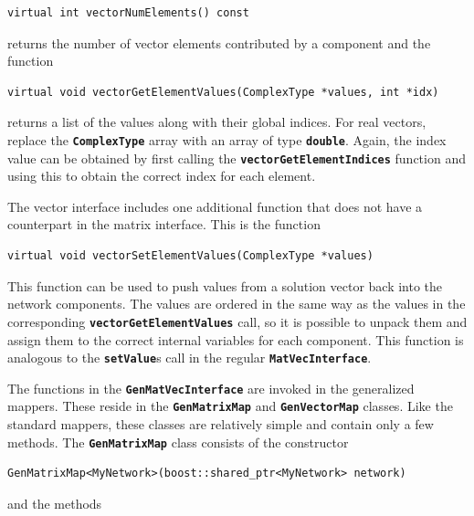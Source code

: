 \documentclass[12pt]{report} %
\begin{document}
{
\color{red}
\begin{Verbatim}[fontseries=b]
virtual int vectorNumElements() const
\end{Verbatim}
}

returns the number of vector elements contributed by a component and the function

{
\color{red}
\begin{Verbatim}[fontseries=b]
virtual void vectorGetElementValues(ComplexType *values, int *idx)
\end{Verbatim}
}

returns a list of the values along with their global indices. For real vectors, replace the \texttt{\textbf{ComplexType}} array with an array of type \texttt{\textbf{double}}. Again, the index value can be obtained by first calling the \texttt{\textbf{vectorGetElementIndices}} function and using this to obtain the correct index for each element.

The vector interface includes one additional function that does not have a counterpart in the matrix interface. This is the function

{
\color{red}
\begin{Verbatim}[fontseries=b]
virtual void vectorSetElementValues(ComplexType *values)
\end{Verbatim}
}

This function can be used to push values from a solution vector back into the network components. The values are ordered in the same way as the values in the corresponding \texttt{\textbf{vectorGetElementValues}} call, so it is possible to unpack them and assign them to the correct internal variables for each component. This function is analogous to the \texttt{\textbf{setValue}}s call in the regular \texttt{\textbf{MatVecInterface}}.

The functions in the \texttt{\textbf{GenMatVecInterface}} are invoked in the generalized mappers. These reside in the \texttt{\textbf{GenMatrixMap}} and \texttt{\textbf{GenVectorMap}} classes. Like the standard mappers, these classes are relatively simple and contain only a few methods. The \texttt{\textbf{GenMatrixMap}} class consists of the constructor

{
\color{red}
\begin{Verbatim}[fontseries=b]
GenMatrixMap<MyNetwork>(boost::shared_ptr<MyNetwork> network)
\end{Verbatim}
}

and the methods
\end{document}
